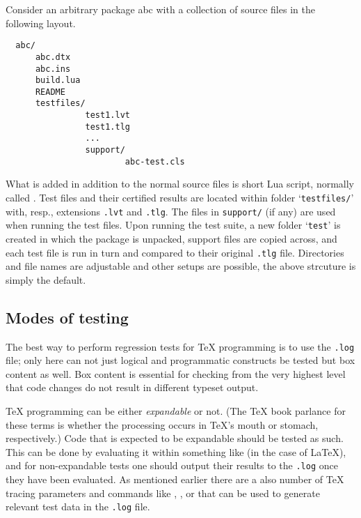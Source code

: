 \documentclass[a4paper]{ltugboat}
\begin{document}
Consider an arbitrary package \textsf{abc} with a collection of source
files in the following layout.
\begin{Verbatim}
  abc/
      abc.dtx
      abc.ins
      build.lua
      README
      testfiles/
                test1.lvt
                test1.tlg
                ...
                support/
                        abc-test.cls
\end{Verbatim}
What is added in addition to the normal source files is short Lua script, normally called \texttt{\drivername}.
Test files and their certified results are located within folder
`\texttt{testfiles/}' with, resp., extensions \texttt{.lvt} and
\texttt{.tlg}.  The files in \texttt{support/} (if any) are used when running
the test files.  Upon running the test suite, a new folder
`\texttt{test}' is created in which the package is unpacked, support
files are copied across, and each test file is run in turn and
compared to their original \texttt{.tlg} file. Directories and file names are adjustable and other setups are possible, the above strcuture is simply the default.

\subsection{Modes of testing}

The best way to perform regression tests for \TeX{} programming is to
use the \texttt{.log} file; only here can not just logical and
programmatic constructs be tested but box content as well.  Box
content is essential for checking from the very highest level that
code changes do not result in different typeset output.

\TeX{} programming can be either \emph{expandable} or not.  (The \TeX
book parlance for these terms is whether the processing occurs in
\TeX's mouth or stomach, respectively.)  Code that is expected to be
expandable should be tested as such.  This can be done by evaluating it within something like  (in the case of \LaTeX), and for non-expandable tests one should output
their results to the \texttt{.log} once they have been evaluated.
%
As mentioned earlier there are a also number of \TeX{} tracing parameters
and commands like , , or  that
can be used to generate relevant test data in the \texttt{.log} file.
\end{document}
